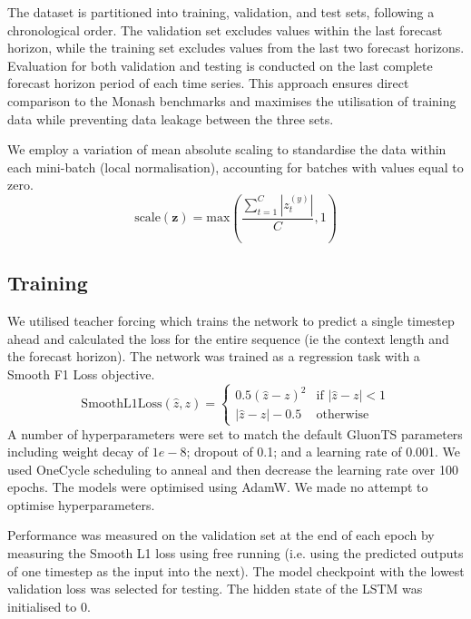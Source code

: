 \documentclass{article}
\newcommand{\contextlength}{C}
\newcommand{\ts}{t}
\begin{document}
The dataset is partitioned into training, validation, and test sets, following a chronological order. 
The validation set excludes values within the last forecast horizon, while the training set excludes 
values from the last two forecast horizons. Evaluation for both validation and testing is conducted 
on the last complete forecast horizon period of each time series. This approach ensures direct comparison to 
the Monash benchmarks \cite{DBLP:conf/nips/GodahewaBWHM21} and maximises the 
utilisation of training data while preventing data leakage between the three sets.

We employ a variation of mean absolute scaling to standardise the data within each mini-batch (local normalisation), 
accounting for batches with values equal to zero.
\begin{equation}
\text{scale}(\mathbf{z}) = 
\text{max}( \frac{ \sum_{\ts=1}^{\contextlength}|z^{(y)}_\ts|}{\contextlength},  1)
\end{equation}
\subsection{Training}
We utilised teacher forcing which trains the network to predict a single
timestep ahead and calculated the loss for the entire sequence (ie the context length and the forecast horizon).
The network was trained as a regression task with a Smooth F1 Loss objective.
\begin{equation}
\text{SmoothL1Loss}(\hat{z}, z) = 
\begin{cases} 
0.5(\hat{z} - z)^2 & \text{if } |\hat{z} - z| < 1 \\
|\hat{z} - z| - 0.5 & \text{otherwise}
\end{cases}
\end{equation}
A number of hyperparameters were set to match the default
GluonTS parameters \cite{gluonts_arxiv} including weight decay of $1e-8$; dropout  of 0.1; and a learning rate of 0.001. 
We used OneCycle scheduling to anneal and then 
decrease the learning rate\cite{smith2018superconvergence} over 100 epochs. The models were optimised using AdamW. We made no attempt to optimise hyperparameters. 

Performance was measured on the validation set at the end of each epoch by measuring the Smooth L1 loss using
free running (i.e. using the predicted outputs of one timestep as the input into the next). The model checkpoint
with the lowest validation loss was selected for testing. The hidden state of the LSTM was initialised to $0$. 
\end{document}
